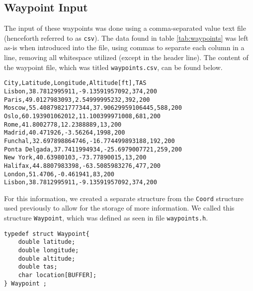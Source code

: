 \documentclass{article}
\begin{document}
\subsection{Waypoint Input}

The input of these waypoints was done using a comma-separated value text file (henceforth referred to as \texttt{csv}). The data found in table \ref{tab:waypoints} was left as-is when introduced into the file, using commas to separate each column in a line, removing all whitespace utilized (except in the header line). The content of the waypoint file, which was titled \texttt{waypoints.csv}, can be found below.
\begin{verbatim}
City,Latitude,Longitude,Altitude[ft],TAS
Lisbon,38.7812995911,-9.13591957092,374,200
Paris,49.0127983093,2.54999995232,392,200
Moscow,55.40879821777344,37.90629959106445,588,200
Oslo,60.193901062012,11.100399971008,681,200
Rome,41.8002778,12.2388889,13,200
Madrid,40.471926,-3.56264,1998,200
Funchal,32.697898864746,-16.774499893188,192,200
Ponta Delgada,37.7411994934,-25.6979007721,259,200
New York,40.63980103,-73.77890015,13,200
Halifax,44.8807983398,-63.5085983276,477,200
London,51.4706,-0.461941,83,200
Lisbon,38.7812995911,-9.13591957092,374,200
\end{verbatim}

For this information, we created a separate structure from the \texttt{Coord} structure used previously to allow for the storage of more information. We called this structure \texttt{Waypoint}, which was defined as seen in file \texttt{waypoints.h}.
\begin{verbatim}
typedef struct Waypoint{
    double latitude;
    double longitude;
    double altitude;
    double tas;
    char location[BUFFER];
} Waypoint ;
\end{verbatim}
\end{document}
